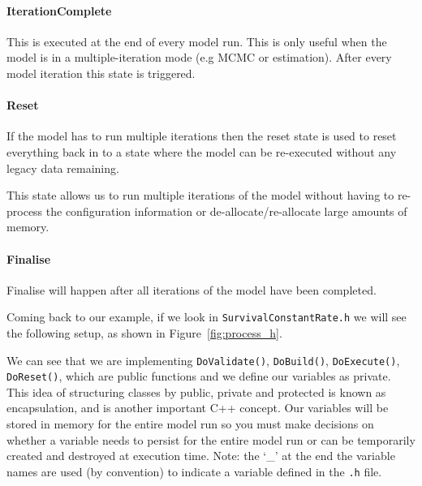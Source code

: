 \paragraph*{IterationComplete}
This is executed at the end of every model run. This is only useful when the model is in a multiple-iteration mode (e.g MCMC or estimation). After every model iteration this state is triggered.

\paragraph*{Reset}
If the model has to run multiple iterations then the reset state is used to reset everything back in to a state where the model can be re-executed without any legacy data remaining.

This state allows us to run multiple iterations of the model without having to re-process the configuration information or de-allocate/re-allocate large amounts of memory.

\paragraph*{Finalise}
Finalise will happen after all iterations of the model have been completed.

Coming back to our example, if we look in \texttt{SurvivalConstantRate.h} we will see the following setup, as shown in Figure~\ref{fig:process_h}.

We can see that we are implementing \texttt{DoValidate()}, \texttt{DoBuild()}, \texttt{DoExecute()}, \texttt{DoReset()}, which are public functions and we define our variables as private. This idea of structuring classes by public, private and protected is known as encapsulation, and is another important C++ concept. Our variables will be stored in memory for the entire model run so you must make decisions on whether a variable needs to persist for the entire model run or can be temporarily created and destroyed at execution time. Note: the `\_' at the end the variable names are used (by convention) to indicate a variable defined in the \texttt{.h} file. 

